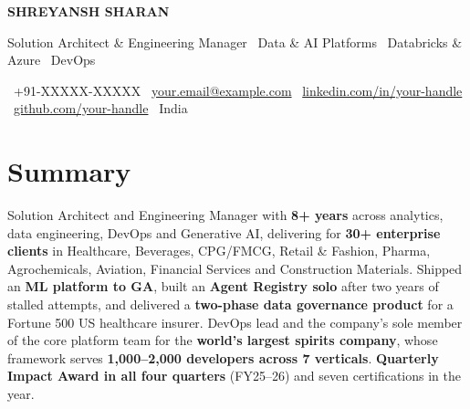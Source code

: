 \documentclass[10pt,a4paper]{article}
\begin{document}
{\fontsize{26}{28}\selectfont\color{navy}\bfseries SHREYANSH SHARAN}\par\vspace{4pt}
{\large\color{accent}Solution Architect \& Engineering Manager \textbar\ Data \& AI Platforms \textbar\ Databricks \& Azure \textbar\ DevOps}\par\vspace{5pt}
{\small\color{muted}%
\faPhone*\ +91-XXXXX-XXXXX\quad
\faEnvelope\ \href{mailto:your.email@example.com}{your.email@example.com}\quad
\faLinkedin\ \href{https://www.linkedin.com/in/your-handle}{linkedin.com/in/your-handle}\quad
\faGithub\ \href{https://github.com/your-handle}{github.com/your-handle}\quad
\faMapMarker*\ India}\par

\section{Summary}
Solution Architect and Engineering Manager with \textbf{8+ years} across analytics, data engineering, DevOps and
Generative AI, delivering for \textbf{30+ enterprise clients} in Healthcare, Beverages, CPG/FMCG, Retail \& Fashion,
Pharma, Agrochemicals, Aviation, Financial Services and Construction Materials. Shipped an \textbf{ML platform to GA},
built an \textbf{Agent Registry solo} after two years of stalled attempts, and delivered a \textbf{two-phase data
governance product} for a Fortune 500 US healthcare insurer. DevOps lead and the company's sole member of the core
platform team for the \textbf{world's largest spirits company}, whose framework serves \textbf{1,000--2,000 developers
across 7 verticals}. \textbf{Quarterly Impact Award in all four quarters} (FY25--26) and seven certifications in the year.

\end{document}
